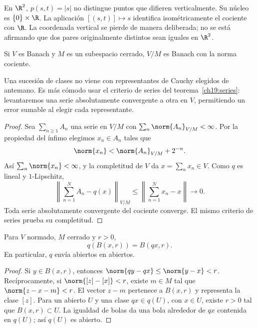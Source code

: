 \begin{ejemplo}
En $\R^2$, $p(s,t)=|s|$ no distingue puntos que difieren verticalmente. Su núcleo es $\{0\}\times\R$. La aplicación $[(s,t)]\mapsto s$ identifica isométricamente el cociente con $\R$. La coordenada vertical se pierde de manera deliberada; no se está afirmando que dos pares originalmente distintos sean iguales en $\R^2$.
\end{ejemplo}

\begin{teorema}\label{ampl:cociente-banach}
Si $V$ es Banach y $M$ es un subespacio cerrado, $V/M$ es Banach con la norma cociente.
\end{teorema}
\begin{estrategia}
Una sucesión de clases no viene con representantes de Cauchy elegidos de antemano. Es más cómodo usar el criterio de series del teorema~\ref{ch19:series}: levantaremos una serie absolutamente convergente a otra en $V$, permitiendo un error sumable al elegir cada representante.
\end{estrategia}
\begin{proof}
Sea $\sum_{n\ge1}A_n$ una serie en $V/M$ con $\sum_n\norm{A_n}_{V/M}<\infty$. Por la propiedad del ínfimo elegimos $x_n\in A_n$ tales que
\[
 \norm{x_n}<\norm{A_n}_{V/M}+2^{-n}.
\]
Así $\sum_n\norm{x_n}<\infty$, y la completitud de $V$ da $x=\sum_nx_n\in V$. Como $q$ es lineal y $1$-Lipschitz,
\[
 \left\|\sum_{n=1}^N A_n-q(x)\right\|_{V/M}
 \le\left\|\sum_{n=1}^N x_n-x\right\|\longrightarrow0.
\]
Toda serie absolutamente convergente del cociente converge. El mismo criterio de series prueba su completitud.
\end{proof}

\begin{proposicion}\label{ampl:cociente-bolas}
Para $V$ normado, $M$ cerrado y $r>0$,
\[
 q(B(x,r))=B(qx,r).
\]
En particular, $q$ envía abiertos en abiertos.
\end{proposicion}
\begin{proof}
Si $y\in B(x,r)$, entonces $\norm{qy-qx}\le\norm{y-x}<r$. Recíprocamente, si $\norm{[z]-[x]}<r$, existe $m\in M$ tal que $\norm{z-x-m}<r$. El vector $z-m$ pertenece a $B(x,r)$ y representa la clase $[z]$. Para un abierto $U$ y una clase $qx\in q(U)$, con $x\in U$, existe $r>0$ tal que $B(x,r)\subset U$. La igualdad de bolas da una bola alrededor de $qx$ contenida en $q(U)$; así $q(U)$ es abierto.
\end{proof}

